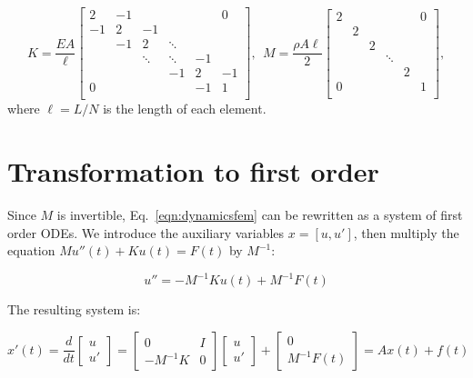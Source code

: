 \documentclass{article}
\begin{document}
\begin{equation*}
K = \dfrac{EA}{\ell}
\begin{bmatrix}
2 & -1 &  &  &  & 0  \\
-1  & 2 & -1 &   &  &  \\
& -1 & 2 & \ddots &  &  \\
&  & \ddots & \ddots & -1 &  \\
&  &  & -1 & 2 & -1 \\
0 &  &  &  & -1 & 1 \\
\end{bmatrix},~~ 
M = \dfrac{\rho A \ell}{2}
\begin{bmatrix}
	2 &  &  &  &  & 0  \\
	  & 2 &  &   &  &  \\
	 &  & 2 &  &  &  \\
	 &  &  & \ddots &  &  \\
	 &  &  & & 2 & \\
	0 &  &  &  &  & 1 \\
\end{bmatrix},
\label{eq:clampedMatrices}
\end{equation*}
where $\ell = L / N$ is the length of each element. %

\section{Transformation to first order}
	
Since $M$ is invertible, Eq.~\eqref{eqn:dynamicsfem} can be rewritten as a system of first order ODEs. We introduce the auxiliary variables $x = [u, u']$, then multiply the equation $Mu''(t) + Ku(t) = F(t)$ by $M^{-1}$:

\begin{equation}
u'' = -M^{-1}Ku(t) + M^{-1}F(t)
\end{equation}

The resulting system is:

\begin{equation}
x'(t) =\dfrac{d}{dt} \begin{bmatrix} u \\ u' \end{bmatrix} = \begin{bmatrix} 0 & I \\ -M^{-1}K & 0 \end{bmatrix}\begin{bmatrix} u \\ u' \end{bmatrix} + \begin{bmatrix} 0 \\ M^{-1}F(t) \end{bmatrix} = Ax(t) + f(t)
\end{equation}
\end{document}
